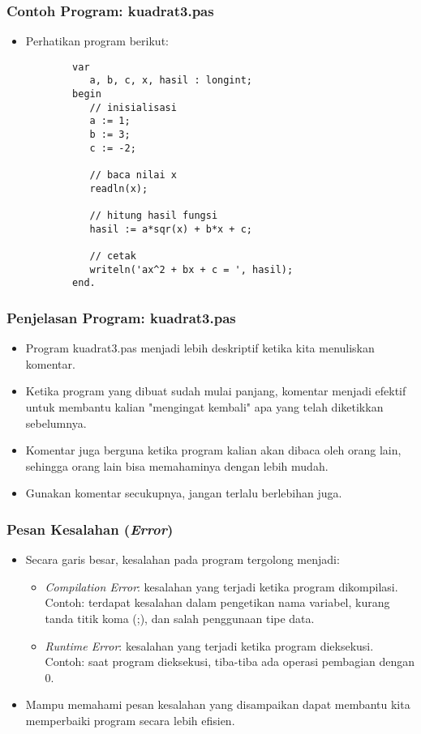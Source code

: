 \documentclass{beamer}
\begin{document}
\begin{frame} [fragile]
\frametitle{Contoh Program: kuadrat3.pas}
\begin{itemize}
	\item Perhatikan program berikut:
	\begin{lstlisting}
		var
		   a, b, c, x, hasil : longint;
		begin
		   // inisialisasi
		   a := 1;
		   b := 3;
		   c := -2;
		   
		   // baca nilai x
		   readln(x);
		
		   // hitung hasil fungsi
		   hasil := a*sqr(x) + b*x + c;
		
		   // cetak
		   writeln('ax^2 + bx + c = ', hasil);
		end.
	\end{lstlisting}
\end{itemize}
\end{frame}

\begin{frame}
\frametitle{Penjelasan Program: kuadrat3.pas}
\begin{itemize}
	\item Program kuadrat3.pas menjadi lebih deskriptif ketika kita menuliskan komentar.
	\item Ketika program yang dibuat sudah mulai panjang, komentar menjadi efektif untuk membantu kalian "mengingat kembali" apa yang telah diketikkan sebelumnya.
	\item Komentar juga berguna ketika program kalian akan dibaca oleh orang lain, sehingga orang lain bisa memahaminya dengan lebih mudah.
	\item Gunakan komentar secukupnya, jangan terlalu berlebihan juga.
\end{itemize}
\end{frame}

\begin{frame}
\frametitle{Pesan Kesalahan (\textit{Error})}
\begin{itemize}
	\item Secara garis besar, kesalahan pada program tergolong menjadi:
	\begin{itemize}
		\item \alert{\textit{Compilation Error}}: kesalahan yang terjadi ketika program dikompilasi.\newline
		Contoh: terdapat kesalahan dalam pengetikan nama variabel, kurang tanda titik koma (;), dan salah penggunaan tipe data.
		\item \alert{\textit{Runtime Error}}: kesalahan yang terjadi ketika program dieksekusi.\newline
		Contoh: saat program dieksekusi, tiba-tiba ada operasi pembagian dengan 0.
	\end{itemize}
	\item Mampu memahami pesan kesalahan yang disampaikan dapat membantu kita memperbaiki program secara lebih efisien.
\end{itemize}
\end{frame}
\end{document}
